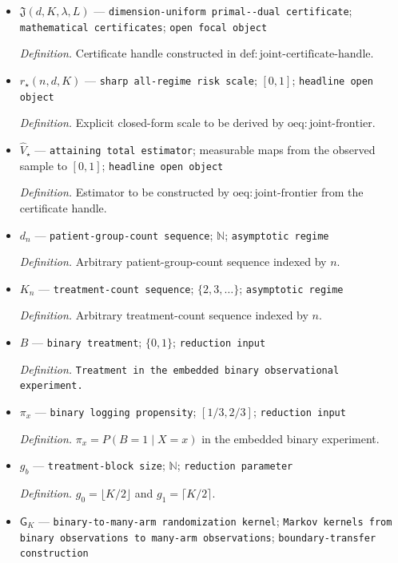 \documentclass{article}
\begin{document}
\begin{itemize}
  \item \(\mathfrak J(d,K,\lambda,L)\) --- \texttt{dimension-\allowbreak{}uniform primal-\allowbreak{}-\allowbreak{}dual certificate}; \texttt{mathematical certificates}; \texttt{open focal object}
  \par\smallskip\noindent\emph{Definition.} Certificate handle constructed in \(\mathrm{def{:}joint\text{-}certificate\text{-}handle}\).
  \item \(r_\star(n,d,K)\) --- \texttt{sharp all-\allowbreak{}regime risk scale}; \([0,1]\); \texttt{headline open object}
  \par\smallskip\noindent\emph{Definition.} Explicit closed-form scale to be derived by \(\mathrm{oeq{:}joint\text{-}frontier}\).
  \item \(\widehat V_\star\) --- \texttt{attaining total estimator}; measurable maps from the observed sample to \([0,1]\); \texttt{headline open object}
  \par\smallskip\noindent\emph{Definition.} Estimator to be constructed by \(\mathrm{oeq{:}joint\text{-}frontier}\) from the certificate handle.
  \item \(d_n\) --- \texttt{patient-\allowbreak{}group-\allowbreak{}count sequence}; \(\mathbb N\); \texttt{asymptotic regime}
  \par\smallskip\noindent\emph{Definition.} Arbitrary patient-group-count sequence indexed by \(n\).
  \item \(K_n\) --- \texttt{treatment-\allowbreak{}count sequence}; \(\{2,3,\ldots\}\); \texttt{asymptotic regime}
  \par\smallskip\noindent\emph{Definition.} Arbitrary treatment-count sequence indexed by \(n\).
  \item \(B\) --- \texttt{binary treatment}; \(\{0,1\}\); \texttt{reduction input}
  \par\smallskip\noindent\emph{Definition.} \texttt{Treatment in the embedded binary observational experiment.}
  \item \(\pi_x\) --- \texttt{binary logging propensity}; \([1/3,2/3]\); \texttt{reduction input}
  \par\smallskip\noindent\emph{Definition.} \(\pi_x=P(B=1\mid X=x)\) in the embedded binary experiment.
  \item \(g_b\) --- \texttt{treatment-\allowbreak{}block size}; \(\mathbb N\); \texttt{reduction parameter}
  \par\smallskip\noindent\emph{Definition.} \(g_0=\lfloor K/2\rfloor\) and \(g_1=\lceil K/2\rceil\).
  \item \(\mathsf G_K\) --- \texttt{binary-\allowbreak{}to-\allowbreak{}many-\allowbreak{}arm randomization kernel}; \texttt{Markov kernels from binary observations to many-\allowbreak{}arm observations}; \texttt{boundary-\allowbreak{}transfer construction}

\end{itemize}
\end{document}
